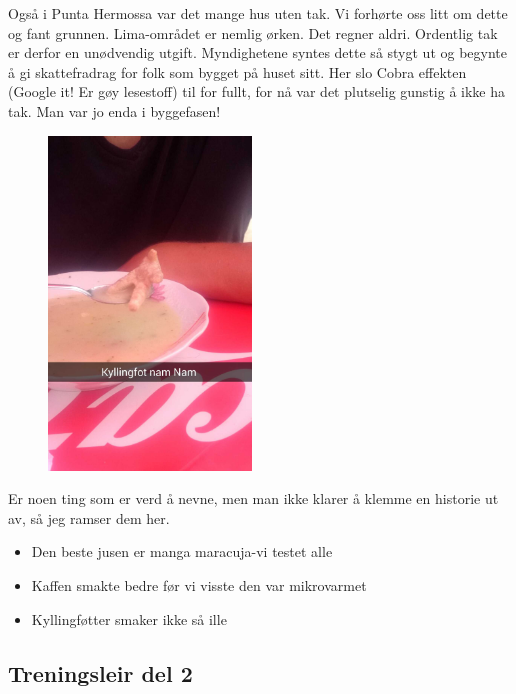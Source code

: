 Også i Punta Hermossa var det mange hus uten tak. Vi forhørte oss litt
om dette og fant grunnen. Lima-området er nemlig ørken. Det regner
aldri. Ordentlig tak er derfor en unødvendig utgift. Myndighetene
syntes dette så stygt ut og begynte å gi skattefradrag for folk som
bygget på huset sitt. Her slo Cobra effekten (Google it!
Er gøy lesestoff) til for fullt, for nå var det plutselig gunstig å ikke
ha tak. Man var jo enda i byggefasen!


\begin{figure}[h]
	\begin{center}
	\includegraphics[width=0.48\textwidth]{kyllingfot}
	\caption{}
\end{center}
\end{figure}



Er noen ting som er verd å nevne, men man ikke klarer å klemme en
historie ut av, så jeg ramser dem her.

\begin{itemize}
	\item Den beste jusen er manga maracuja-vi testet
			alle
		\item Kaffen smakte bedre før vi visste den var
			mikrovarmet
		\item Kyllingføtter smaker ikke så ille
\end{itemize}


\subsection*{Treningsleir del 2}


